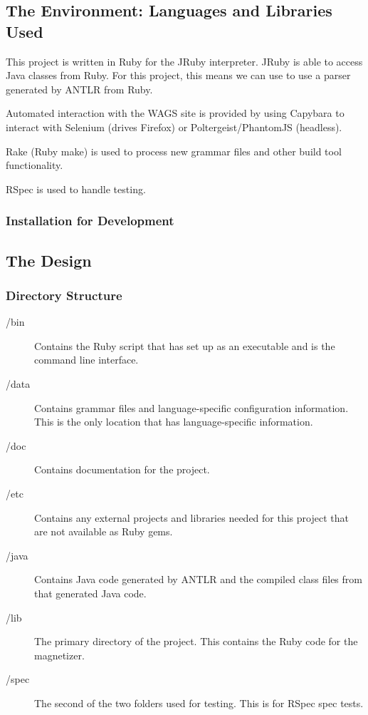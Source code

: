 \documentclass[letter,10pt]{article}
\begin{document}
\subsection{The Environment: Languages and Libraries Used}


This project is written in Ruby for the JRuby interpreter. JRuby is able
to access Java classes from Ruby. For this project, this means we can 
use to use a parser generated by ANTLR from Ruby.

Automated interaction with the WAGS site is provided by using Capybara 
to interact with Selenium (drives Firefox) or Poltergeist/PhantomJS 
(headless).

Rake (Ruby make) is used to process new grammar files and other build 
tool functionality.

RSpec is used to handle testing.

\subsubsection{Installation for Development}

\subsection{The Design}

\subsubsection{Directory Structure}
\begin{description}
 \item [/bin]
    Contains the Ruby script that has set up as an 
executable and is the command line interface.

 \item [/data]
    Contains grammar files and language-specific 
configuration information. This is the only location that has 
language-specific information.

 \item [/doc]
    Contains documentation for the project.
    
 \item [/etc]
    Contains any external projects and libraries needed for this 
project that are not available as Ruby gems.

 \item [/java]
    Contains Java code generated by ANTLR and the compiled class files 
from that generated Java code.

 \item [/lib]
    The primary directory of the project. This contains the Ruby code 
for the magnetizer.

 \item [/spec]
    The second of the two folders used for testing. This is for RSpec 
spec tests.

\end{description}
\end{document}
